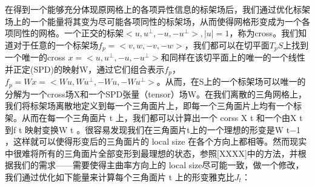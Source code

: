 在得到一个能够充分体现原网格上的各项异性信息的标架场后，我们通过优化标架场上的一个能量将其变为尽可能各项同性的标架场，从而使得网格形变成为一个各项同性的网格。一个正交的标架$< u, u^\bot , −u, −u^\bot >, |u| = 1$，称为cross。我们知道对于任意的一个标架场$f_p = <v, w, −v, −w >$，我们都可以在切平面$T_p S$上找到一个唯一的cross $x =<u, u^\bot , −u, −u^\bot >$和同样在该切平面上的唯一的一个线性并正定(SPD)的映射W，通过它们组合表示$f_p$，$f_p = Wx = <Wu, Wu^\bot, -Wu, -Wu^\bot>$。从而，在S上的一个标架场可以唯一的分解为一个cross场X和一个SPD张量（tensor）场W。在我们离散的三角网格上，我们将标架场离散地定义到每一个三角面片上，即每一个三角面片上均有一个标架。从而在每一个三角面片 t 上，我们都可以计算出一个 corss X t 和一个由X t 到f t 映射变换W t 。很容易发现我们在三角面片t上的一个理想的形变是W t−1 ，这样就可以使得形变后的三角面片的 local size 在各个方向上都相等。然而现实中很难将所有的三角面片全部变形到最理想的状态，参照[XXXX]中的方法，并根据我们的需求——需要使得主曲率方向上的 local size尽可能一致，做一个修改，我们通过优化如下能量来计算每个三角面片 t 上的形变雅克比$J_t$：

